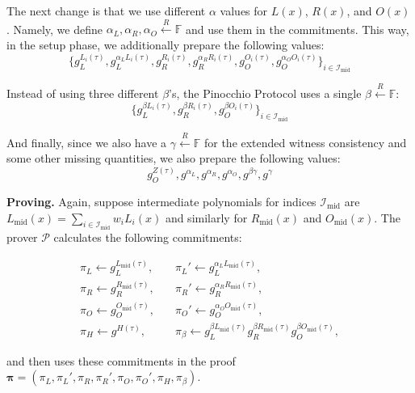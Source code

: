 \documentclass[../lecture-notes.tex]{subfiles}
\begin{document}
The next change is that we use different $\alpha$ values for $L(x)$, $R(x)$, and $O(x)$. Namely, we define $\alpha_L,\alpha_R,\alpha_O \xleftarrow{R} \mathbb{F}$ and use them in the commitments. This way, in the setup phase, we additionally prepare the following values:
\begin{equation*}
    \{g_L^{L_i(\tau)}, g_L^{\alpha_LL_i(\tau)}, g_R^{R_i(\tau)}, g_R^{\alpha_RR_i(\tau)}, g_O^{O_i(\tau)}, g_O^{\alpha_O O_i(\tau)}\}_{i \in \mathcal{I}_{\text{mid}}}
\end{equation*}

Instead of using three different $\beta$'s, the Pinocchio Protocol uses a single $\beta \xleftarrow{R} \mathbb{F}$:
\begin{equation*}
    \{g_L^{\beta L_i(\tau)}, g_R^{\beta R_i(\tau)},g_O^{\beta O_i(\tau)} \}_{i \in \mathcal{I}_{\text{mid}}}
\end{equation*}

And finally, since we also have a $\gamma \xleftarrow{R} \mathbb{F}$ for the extended witness consistency and some other missing quantities, we also prepare the following values:
\begin{equation*}
    g_O^{Z(\tau)}, g^{\alpha_L}, g^{\alpha_R}, g^{\alpha_O},g^{\beta\gamma}, g^{\gamma}
\end{equation*}

\textcolor{green!50!black}{\textbf{Proving.}} Again, suppose intermediate polynomials for indices $\mathcal{I}_{\text{mid}}$ are $L_{\text{mid}}(x) = \sum_{i \in \mathcal{I}_{\text{mid}}}w_iL_i(x)$ and similarly for $R_{\text{mid}}(x)$ and $O_{\text{mid}}(x)$. The prover $\mathcal{P}$ calculates the following commitments:

\begin{align*}
    \pi_L \gets g_L^{L_{\text{mid}}(\tau)}, & \quad \pi_L' \gets g_L^{\alpha_LL_{\text{mid}}(\tau)}, \\
    \pi_R \gets g_R^{R_{\text{mid}}(\tau)}, & \quad \pi_R' \gets g_R^{\alpha_RR_{\text{mid}}(\tau)}, \\
    \pi_O \gets g_O^{O_{\text{mid}}(\tau)}, & \quad \pi_O' \gets g_O^{\alpha_OO_{\text{mid}}(\tau)}, \\
    \pi_H \gets g^{H(\tau)}, & \quad \pi_{\beta} \gets g_L^{\beta L_{\text{mid}}(\tau)}g_R^{\beta R_{\text{mid}}(\tau)}g_O^{\beta O_{\text{mid}}(\tau)},
\end{align*}

and then uses these commitments in the proof $\boldsymbol{\pi} = (\pi_L,\pi_L',\pi_R,\pi_R',\pi_O,\pi_O',\pi_H,\pi_{\beta})$.
\end{document}
